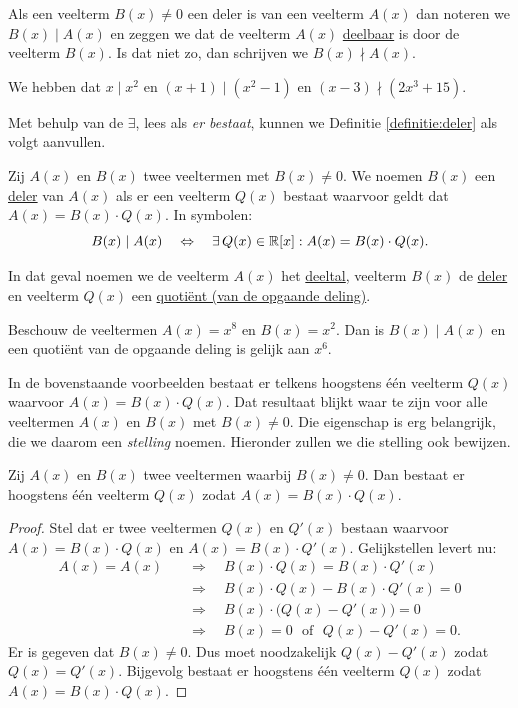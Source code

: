 \documentclass{ximera}
\begin{document}
Als een veelterm $B(x) \neq 0$ een deler is van een veelterm $A(x)$ dan noteren we $B(x) \mid A(x)$ en zeggen we dat de veelterm $A(x)$ \underline{deelbaar} is door de veelterm $B(x)$. Is dat niet zo, dan schrijven we $B(x) \nmid A(x)$. 

\begin{voorbeeld} 
We hebben dat $x \mid x^2$ en $(x+1) \mid (x^2-1)$ en $(x-3) \nmid (2x^3+15)$.
\end{voorbeeld}

Met behulp van de  $\exists$, lees als {\em er bestaat}, kunnen we Definitie \ref{definitie:deler} als volgt aanvullen.

\begin{definitie}
Zij $A(x)$ en $B(x)$ twee veeltermen met $B(x) \neq 0$. We noemen $B(x)$ een \underline{deler} van $A(x)$ als er een veelterm $Q(x)$ bestaat waarvoor geldt dat $A(x) = B(x)\cdot Q(x)$. In symbolen:
\[
B(x) \mid A(x) \quad \Leftrightarrow \quad \exists \, Q(x) \in \mathbb{R}[x]: A(x) = B(x)\cdot Q(x).
\]
\end{definitie}

In dat geval noemen we de veelterm $A(x)$ het \underline{deeltal}, veelterm $B(x)$ de \underline{deler} en veelterm $Q(x)$ een \underline{quoti\"ent (van de opgaande deling)}. 

\begin{voorbeeld}
Beschouw de veeltermen $A(x) = x^8$ en $B(x) = x^2$. Dan is $B(x) \mid A(x)$ en een quoti\"ent van de opgaande deling is gelijk aan $x^6$. 
\end{voorbeeld}

In de bovenstaande voorbeelden bestaat er telkens hoogstens \'e\'en veelterm $Q(x)$ waarvoor $A(x) = B(x)\cdot Q(x)$. Dat resultaat blijkt waar te zijn voor alle veeltermen $A(x)$ en $B(x)$ met $B(x) \neq 0$. Die eigenschap is erg belangrijk, die we daarom een {\em stelling} noemen. Hieronder zullen we die stelling ook bewijzen. 

\begin{stelling}
Zij $A(x)$ en $B(x)$ twee veeltermen waarbij $B(x) \neq 0$. Dan bestaat er hoogstens \'e\'en veelterm $Q(x)$ zodat $A(x) = B(x)\cdot Q(x)$. 
\end{stelling}
\begin{proof}
Stel dat er twee veeltermen $Q(x)$ en $Q'(x)$ bestaan waarvoor $A(x) = B(x)\cdot Q(x)$ en $A(x) = B(x)\cdot Q'(x)$. Gelijkstellen levert nu:
\begin{align*}
A(x) = A(x) \quad & \Rightarrow \quad B(x)\cdot Q(x) = B(x)\cdot Q'(x) \\
& \Rightarrow \quad B(x)\cdot Q(x) - B(x)\cdot Q'(x) = 0 \\
& \Rightarrow \quad B(x) \cdot \bigl(Q(x) - Q'(x) \bigr) = 0 \\
& \Rightarrow \quad B(x) = 0 \,\,\text{ of } \,\, Q(x) - Q'(x) = 0. 
\end{align*}
Er is gegeven dat $B(x) \neq 0$. Dus moet noodzakelijk $Q(x) - Q'(x)$ zodat $Q(x) = Q'(x)$. Bijgevolg bestaat er hoogstens \'e\'en veelterm $Q(x)$ zodat $A(x) = B(x)\cdot Q(x)$.
\end{proof}
\end{document}
